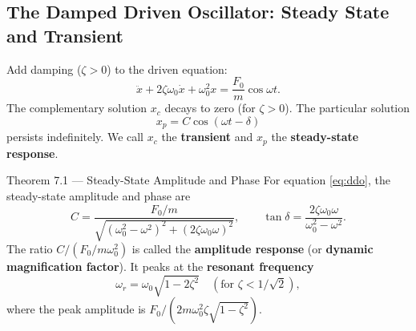 \documentclass[12pt,a4paper]{article}
\begin{document}
\subsection{The Damped Driven Oscillator: Steady State and Transient}

Add damping ($\zeta > 0$) to the driven equation:
\begin{equation}
  \ddot{x} + 2\zeta\omega_0\dot{x} + \omega_0^2 x = \frac{F_0}{m}\cos\omega t.
  \label{eq:ddo}
\end{equation}
The complementary solution $x_c$ decays to zero (for $\zeta > 0$). The
particular solution
\[
  x_p = C\cos(\omega t - \delta)
\]
persists indefinitely. We call $x_c$ the \textbf{transient} and $x_p$ the
\textbf{steady-state response}.

\begin{theorembox}{Theorem 7.1 --- Steady-State Amplitude and Phase}
For equation \eqref{eq:ddo}, the steady-state amplitude and phase are
\[
  C = \frac{F_0/m}{\sqrt{(\omega_0^2-\omega^2)^2 + (2\zeta\omega_0\omega)^2}},
  \qquad
  \tan\delta = \frac{2\zeta\omega_0\omega}{\omega_0^2 - \omega^2}.
\]
The ratio $C/(F_0/m\omega_0^2)$ is called the \textbf{amplitude response} (or
\textbf{dynamic magnification factor}). It peaks at the \textbf{resonant frequency}
\[
  \omega_r = \omega_0\sqrt{1 - 2\zeta^2} \quad (\text{for } \zeta < 1/\sqrt{2}),
\]
where the peak amplitude is $F_0/(2m\omega_0^2\zeta\sqrt{1-\zeta^2})$.
\end{theorembox}
\end{document}
